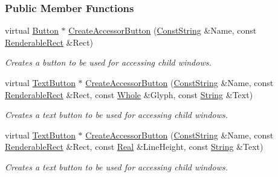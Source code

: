 \subsubsection*{Public Member Functions}
\begin{DoxyCompactItemize}
\item 
virtual \hyperlink{classMezzanine_1_1UI_1_1Button}{Button} $\ast$ \hyperlink{classMezzanine_1_1UI_1_1MenuWindow_a52aa67a7c69ed7ad7af746c3230e08f8}{CreateAccessorButton} (\hyperlink{namespaceMezzanine_a63cd699ac54b73953f35ec9cfc05e506}{ConstString} \&Name, const \hyperlink{structMezzanine_1_1UI_1_1RenderableRect}{RenderableRect} \&Rect)
\begin{DoxyCompactList}\small\item\em Creates a button to be used for accessing child windows. \item\end{DoxyCompactList}\item 
virtual \hyperlink{classMezzanine_1_1UI_1_1TextButton}{TextButton} $\ast$ \hyperlink{classMezzanine_1_1UI_1_1MenuWindow_a4520c4a2e0b680ac52c0669d92d2c4f5}{CreateAccessorButton} (\hyperlink{namespaceMezzanine_a63cd699ac54b73953f35ec9cfc05e506}{ConstString} \&Name, const \hyperlink{structMezzanine_1_1UI_1_1RenderableRect}{RenderableRect} \&Rect, const \hyperlink{namespaceMezzanine_adcbb6ce6d1eb4379d109e51171e2e493}{Whole} \&Glyph, const \hyperlink{namespaceMezzanine_acf9fcc130e6ebf08e3d8491aebcf1c86}{String} \&Text)
\begin{DoxyCompactList}\small\item\em Creates a text button to be used for accessing child windows. \item\end{DoxyCompactList}\item 
virtual \hyperlink{classMezzanine_1_1UI_1_1TextButton}{TextButton} $\ast$ \hyperlink{classMezzanine_1_1UI_1_1MenuWindow_a559f35d54a23ebb211c8b47f8770f25b}{CreateAccessorButton} (\hyperlink{namespaceMezzanine_a63cd699ac54b73953f35ec9cfc05e506}{ConstString} \&Name, const \hyperlink{structMezzanine_1_1UI_1_1RenderableRect}{RenderableRect} \&Rect, const \hyperlink{namespaceMezzanine_a726731b1a7df72bf3583e4a97282c6f6}{Real} \&LineHeight, const \hyperlink{namespaceMezzanine_acf9fcc130e6ebf08e3d8491aebcf1c86}{String} \&Text)
\begin{DoxyCompactList}\small\item\em Creates a text button to be used for accessing child windows. \item\end{DoxyCompactList}\item 

\end{DoxyCompactItemize}
